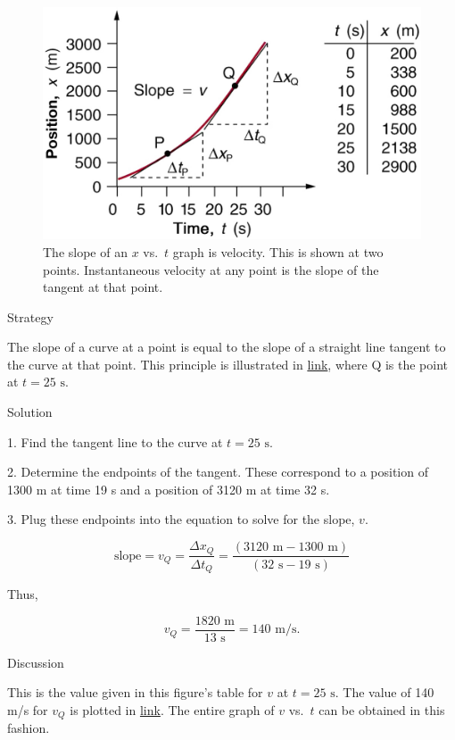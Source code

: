\documentclass[
]{book}
\begin{document}
\begin{figure}
\hypertarget{import-auto-id4141386}{%
\centering
\includegraphics{images/Figure_02_07_03b.jpg}
\caption{The slope of an \(x{}\) vs.~\(t{}\) graph is velocity. This is shown at
two points. Instantaneous velocity at any point is the slope of the
tangent at that
point.}\label{import-auto-id4141386}
}
\end{figure}

{Strategy}

The slope of a curve at a point is equal to the slope of a straight line
tangent to the curve at that point. This principle is illustrated in
\protect\hyperlink{import-auto-id4141386}{link}, where Q is the
point at \({t = \text{25\ s}}{}\).

{Solution}

1. Find the tangent line to the curve at \({t = \text{25\ s}}{}\).

2. Determine the endpoints of the tangent. These correspond to a
position of 1300 m at time 19 s and a position of 3120 m at time 32 s.

3. Plug these endpoints into the equation to solve for the slope,
\emph{\(v{}\)}.

\leavevmode{}%
\[{{\text{slope} = v_{Q}} = \frac{{\Delta x}_{Q}}{{\Delta t}_{Q}}} = \frac{\left( {\text{3120\ m} - \text{1300\ m}} \right)}{\left( {\text{32\ s} - \text{19\ s}} \right)}\]

Thus,

\leavevmode{}%
\[{v_{Q} = \frac{\text{1820\ m}}{\text{13\ s}}} = \text{140\ m/s.}\]

{Discussion}

This is the value given in this figure's table for \(v{}\) at
\(t = \text{25\ s}\). The value of 140 m/s for \(v_{Q}\) is plotted in
\protect\hyperlink{import-auto-id4141386}{link}. The entire graph
of \(v{}\) vs.~\(t\) can be obtained in this fashion.
\end{document}
